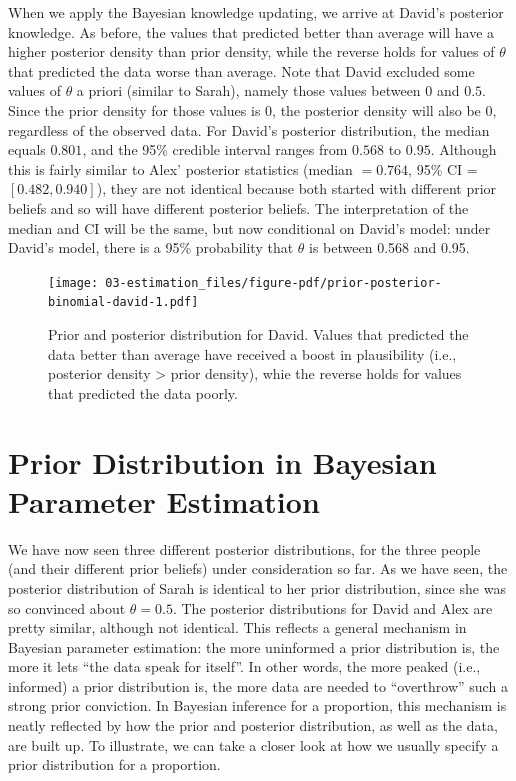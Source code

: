 \documentclass[
  letterpaper,
  DIV=11,
  numbers=noendperiod]{scrreprt}
\begin{document}
When we apply the Bayesian knowledge updating, we arrive at David's
posterior knowledge. As before, the values that predicted better than
average will have a higher posterior density than prior density, while
the reverse holds for values of \(\theta\) that predicted the data worse
than average. Note that David excluded some values of \(\theta\) a
priori (similar to Sarah), namely those values between 0 and \(0.5\).
Since the prior density for those values is 0, the posterior density
will also be 0, regardless of the observed data. For David's posterior
distribution, the median equals \(0.801\), and the 95\% credible
interval ranges from \(0.568\) to \(0.95\). Although this is fairly
similar to Alex' posterior statistics (median \(=0.764\), 95\% CI =
\([0.482, 0.940]\)), they are not identical because both started with
different prior beliefs and so will have different posterior beliefs.
The interpretation of the median and CI will be the same, but now
conditional on David's model: under David's model, there is a 95\%
probability that \(\theta\) is between 0.568 and 0.95.

\begin{figure}

{\centering \texttt{[image: 03-estimation\_files/figure-pdf/prior-posterior-binomial-david-1.pdf]}

}

\caption{Prior and posterior distribution for David. Values that
predicted the data better than average have received a boost in
plausibility (i.e., posterior density \textgreater{} prior density),
whie the reverse holds for values that predicted the data poorly.}

\end{figure}

\hypertarget{prior-distribution-in-bayesian-parameter-estimation}{%
\section{Prior Distribution in Bayesian Parameter
Estimation}\label{prior-distribution-in-bayesian-parameter-estimation}}

We have now seen three different posterior distributions, for the three
people (and their different prior beliefs) under consideration so far.
As we have seen, the posterior distribution of Sarah is identical to her
prior distribution, since she was so convinced about \(\theta = 0.5\).
The posterior distributions for David and Alex are pretty similar,
although not identical. This reflects a general mechanism in Bayesian
parameter estimation: the more uninformed a prior distribution is, the
more it lets ``the data speak for itself''. In other words, the more
peaked (i.e., informed) a prior distribution is, the more data are
needed to ``overthrow'' such a strong prior conviction. In Bayesian
inference for a proportion, this mechanism is neatly reflected by how
the prior and posterior distribution, as well as the data, are built up.
To illustrate, we can take a closer look at how we usually specify a
prior distribution for a proportion.
\end{document}

